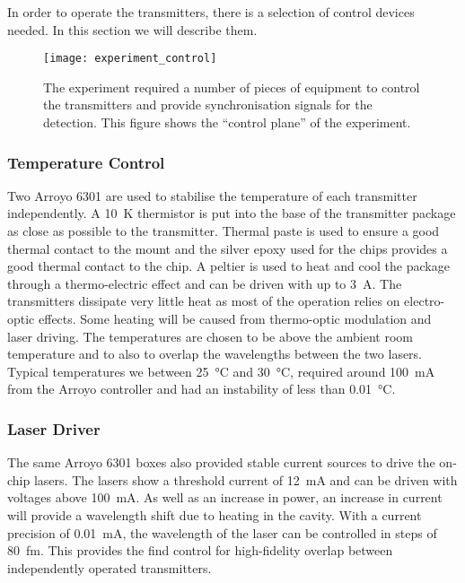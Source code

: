 In order to operate the transmitters, there is a selection of control devices needed. In this section we will describe them.

\begin{figure}
	\centering
	\texttt{[image: experiment\_control]}
	\caption[Control electronic schematic of the \ac{MDI} experiment]{The experiment required a number of pieces of equipment to control the transmitters and provide synchronisation signals for the detection. This figure shows the ``control plane'' of the experiment.}
	\label{fig04:exp_control}
\end{figure}

\subsubsection*{Temperature Control}

Two Arroyo 6301 are used to stabilise the temperature of each transmitter independently. A \SI{10}{K} thermistor is put into the base of the transmitter package as close as possible to the transmitter. Thermal paste is used to ensure a good thermal contact to the mount and the silver epoxy used for the chips provides a good thermal contact to the chip. A peltier is used to heat and cool the package through a thermo-electric effect and can be driven with up to \SI{3}{A}. The transmitters dissipate very little heat as most of the operation relies on electro-optic effects. Some heating will be caused from thermo-optic modulation and laser driving. The temperatures are chosen to be above the ambient room temperature and to also to overlap the wavelengths between the two lasers. Typical temperatures we between \SI{25}{\celsius} and \SI{30}{\celsius}, required around \SI{100}{mA} from the Arroyo controller and had an instability of less than \SI{0.01}{\celsius}.

\subsubsection*{Laser Driver}

The same Arroyo 6301 boxes also provided stable current sources to drive the on-chip lasers. The lasers show a threshold current of \SI{12}{mA} and can be driven with voltages above \SI{100}{mA}. As well as an increase in power, an increase in current will provide a wavelength shift due to heating in the cavity. With a current precision of \SI{0.01}{mA}, the wavelength of the laser can be controlled in steps of \SI{80}{fm}. This provides the find control for high-fidelity overlap between independently operated transmitters. 

